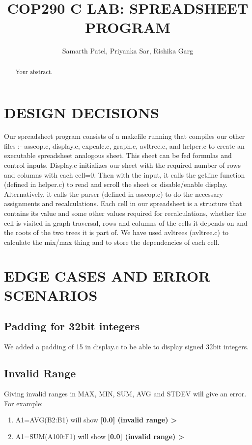 \documentclass[a4paper]{article}
\title{COP290 C LAB: SPREADSHEET PROGRAM}
\author{Samarth Patel, Priyanka Sar, Rishika Garg}
\begin{document}
\maketitle

\begin{abstract}
Your abstract.
\end{abstract}

\section{DESIGN DECISIONS}

Our spreadsheet program consists of a makefile running that compiles our other files :- asscop.c, display.c, expcalc.c, graph.c, avltree.c, and helper.c to create an executable spreadsheet analogous sheet. This sheet can be fed formulas and control inputs. Display.c initializes our sheet with the required number of rows and columns with each cell=0. Then with the input, it calls the getline function (defined in helper.c) to read and scroll the sheet or disable/enable display. Alternatively, it calls the parser (defined in asscop.c) to do the necessary assignments and recalculations. Each cell in our spreadsheet is a structure that contains its value and some other values required for recalculations, whether the cell is visited in graph traversal, rows and columns of the cells it depends on and the roots of the two trees it is part of. We have used avltrees (avltree.c) to calculate the mix/max thing and to store the dependencies of each cell. 

\section{EDGE CASES AND ERROR SCENARIOS}

\subsection{Padding for 32bit integers}

We added a padding of 15 in display.c to be able to display signed 32bit integers.

\subsection{Invalid Range}

Giving invalid ranges in MAX, MIN, SUM, AVG and STDEV will give an error. For example: 
\begin{enumerate}
\item A1=AVG(B2:B1) will show \textbf{ [0.0] (invalid range) > }
\item A1=SUM(A100:F1) will show \textbf{ [0.0] (invalid range) > }
\end{enumerate}
\end{document}
